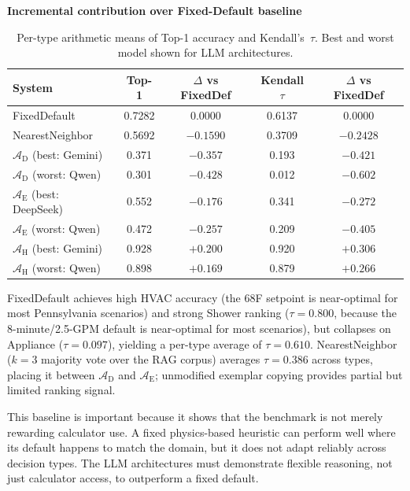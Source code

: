 \documentclass[final,3p,times]{elsarticle}
\begin{document}
\begin{table}[htbp]
\begin{threeparttable}
  \centering
  \textbf{Incremental contribution over Fixed-Default baseline}
  \caption{Per-type arithmetic means of Top-1 accuracy and Kendall's~$\tau$. Best and worst model shown for LLM architectures.}
  \label{tab:incremental-contribution}
  \begin{tabular}{lcccc}
    \toprule
    System & Top-1 & $\Delta$ vs FixedDef & Kendall $\tau$ & $\Delta$ vs FixedDef \\
    \midrule
    FixedDefault & 0.7282 & $0.0000$ & 0.6137 & $0.0000$ \\
    NearestNeighbor & 0.5692 & $-0.1590$ & 0.3709 & $-0.2428$ \\
    \addlinespace
    $\mathcal{A}_{\text{D}}$ (best: Gemini) & 0.371 & $-0.357$ & 0.193 & $-0.421$ \\
    $\mathcal{A}_{\text{D}}$ (worst: Qwen)   & 0.301 & $-0.428$ & 0.012 & $-0.602$ \\
    \addlinespace
    $\mathcal{A}_{\text{E}}$ (best: DeepSeek) & 0.552 & $-0.176$ & 0.341 & $-0.272$ \\
    $\mathcal{A}_{\text{E}}$ (worst: Qwen)    & 0.472 & $-0.257$ & 0.209 & $-0.405$ \\
    \addlinespace
    $\mathcal{A}_{\text{H}}$ (best: Gemini) & 0.928 & $+0.200$ & 0.920 & $+0.306$ \\
    $\mathcal{A}_{\text{H}}$ (worst: Qwen)  & 0.898 & $+0.169$ & 0.879 & $+0.266$ \\
    \bottomrule
  \end{tabular}
\end{threeparttable}
\end{table}
\FloatBarrier

FixedDefault achieves high HVAC accuracy (the 68\textdegree{}F setpoint is near-optimal for most Pennsylvania scenarios) and strong Shower ranking ($\tau = 0.800$, because the 8-minute/2.5-GPM default is near-optimal for most scenarios), but collapses on Appliance ($\tau = 0.097$), yielding a per-type average of $\tau = 0.610$. NearestNeighbor ($k=3$ majority vote over the RAG corpus) averages $\tau = 0.386$ across types, placing it between $\mathcal{A}_{\text{D}}$ and $\mathcal{A}_{\text{E}}$; unmodified exemplar copying provides partial but limited ranking signal.

This baseline is important because it shows that the benchmark is not merely rewarding calculator use. A fixed physics-based heuristic can perform well where its default happens to match the domain, but it does not adapt reliably across decision types. The LLM architectures must demonstrate flexible reasoning, not just calculator access, to outperform a fixed default.
\end{document}
